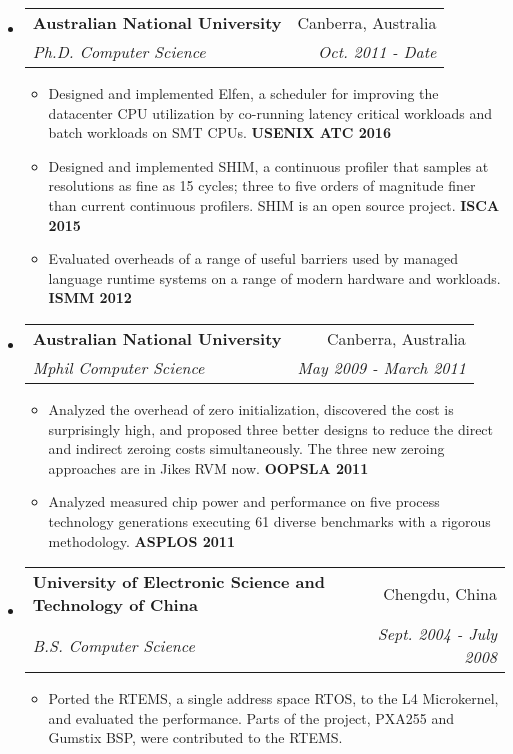 \documentclass[letterpaper,11pt]{article}
\makeatletter
\newcommand{\resitem}[1]{\item #1 \vspace{-2pt}}
\newcommand{\ressubheading}[4]{
\begin{tabular*}{6.5in}{l@{\cftdotfill{\cftsecdotsep}\extracolsep{\fill}}r}
		\textbf{#1} & #2 \\
		\textit{#3} & \textit{#4} \\
\end{tabular*}\vspace{-6pt}}
\makeatother
\begin{document}
\begin{itemize}

\item
	\ressubheading{Australian National University}{Canberra,
          Australia}{Ph.D. Computer Science}{Oct. 2011 - Date}
	\begin{itemize}
                \resitem {Designed and implemented Elfen, a scheduler for improving the datacenter CPU utilization by co-running
                  latency critical workloads and batch workloads on SMT CPUs. {\bf USENIX ATC 2016}}

                \resitem {Designed and implemented SHIM, a continuous profiler
                that samples at resolutions as fine as 15 cycles; three to five
                orders of magnitude finer than current continuous
                profilers. SHIM is an open source project. {\bf ISCA 2015}}

		\resitem {Evaluated overheads of a range of useful barriers used
                by managed language runtime systems on a range of modern
                hardware and workloads. {\bf ISMM 2012}}

	\end{itemize}

\item
	\ressubheading{Australian National University}{Canberra, Australia}{Mphil
          Computer Science }{May 2009 - March 2011}
	\begin{itemize}
          \resitem {Analyzed the overhead of zero initialization, discovered the
          cost is surprisingly high, and proposed three better designs to reduce
          the direct and indirect zeroing costs simultaneously. The three new
          zeroing approaches are in Jikes RVM now.  {\bf OOPSLA 2011}}

          \resitem {Analyzed measured chip power and performance on five
          process technology generations executing 61 diverse benchmarks with a
          rigorous methodology. {\bf ASPLOS 2011}}
          
	\end{itemize}

\item
	\ressubheading{University of Electronic Science and Technology of
          China}{Chengdu, China}{B.S. Computer Science}{Sept. 2004 - July 2008}
        \begin{itemize}         
          \resitem {Ported the RTEMS, a single address space RTOS, to the L4
          Microkernel, and evaluated the performance. Parts of the project,
          PXA255 and Gumstix BSP, were contributed to the RTEMS.}
          \end{itemize}
\end{itemize}
\end{document}
